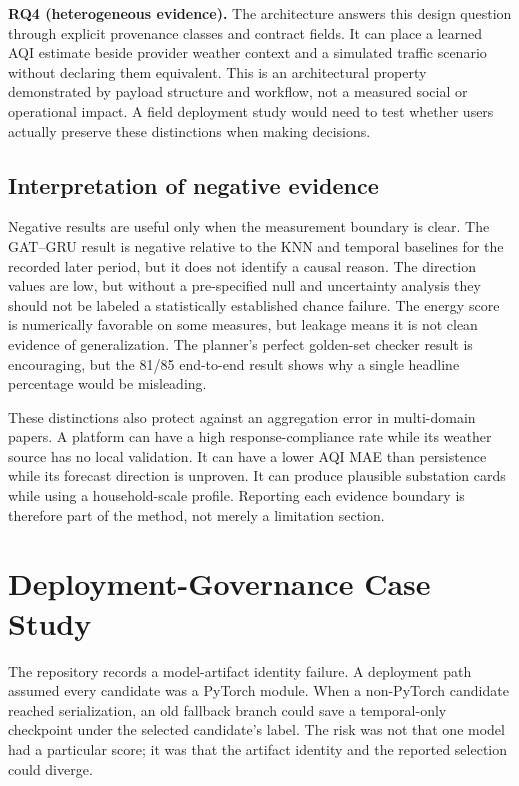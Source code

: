 \documentclass[conference]{IEEEtran}
\begin{document}
\textbf{RQ4 (heterogeneous evidence).} The architecture answers this design question through explicit provenance classes and contract fields. It can place a learned AQI estimate beside provider weather context and a simulated traffic scenario without declaring them equivalent. This is an architectural property demonstrated by payload structure and workflow, not a measured social or operational impact. A field deployment study would need to test whether users actually preserve these distinctions when making decisions.

\subsection{Interpretation of negative evidence}
Negative results are useful only when the measurement boundary is clear. The GAT--GRU result is negative relative to the KNN and temporal baselines for the recorded later period, but it does not identify a causal reason. The direction values are low, but without a pre-specified null and uncertainty analysis they should not be labeled a statistically established chance failure. The energy score is numerically favorable on some measures, but leakage means it is not clean evidence of generalization. The planner's perfect golden-set checker result is encouraging, but the 81/85 end-to-end result shows why a single headline percentage would be misleading.

These distinctions also protect against an aggregation error in multi-domain papers. A platform can have a high response-compliance rate while its weather source has no local validation. It can have a lower AQI MAE than persistence while its forecast direction is unproven. It can produce plausible substation cards while using a household-scale profile. Reporting each evidence boundary is therefore part of the method, not merely a limitation section.

\section{Deployment-Governance Case Study}
\label{sec:governance}
The repository records a model-artifact identity failure. A deployment path assumed every candidate was a PyTorch module. When a non-PyTorch candidate reached serialization, an old fallback branch could save a temporal-only checkpoint under the selected candidate's label. The risk was not that one model had a particular score; it was that the artifact identity and the reported selection could diverge.
\end{document}
